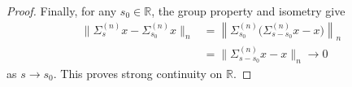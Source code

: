 \documentclass[10pt,a4paper]{amsart}
\begin{document}
\begin{proof}
Finally, for any \(s_0\in\mathbb R\), the group property and isometry give
\[
\begin{aligned}
        \|\Sigma_s^{(n)}x-\Sigma_{s_0}^{(n)}x\|_n
        &=
        \left\|
        \Sigma_{s_0}^{(n)}
        \bigl(\Sigma_{s-s_0}^{(n)}x-x\bigr)
        \right\|_n                                   \\
        &=
        \|\Sigma_{s-s_0}^{(n)}x-x\|_n
        \longrightarrow0
\end{aligned}
\]
as \(s\to s_0\).  This proves strong continuity on \(\mathbb R\).
\end{proof}
\end{document}
